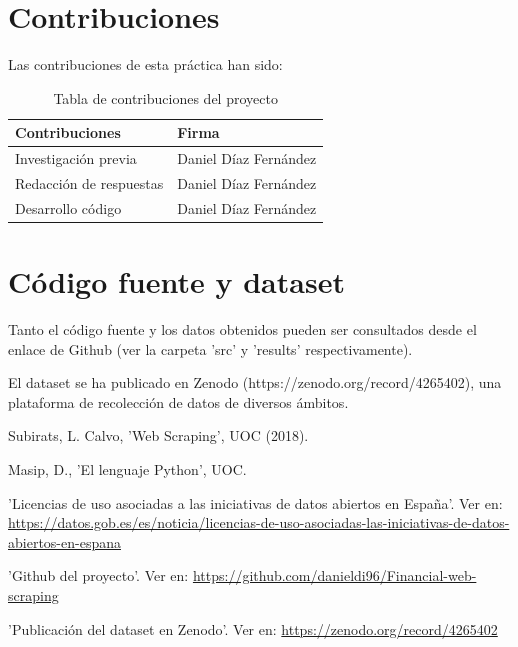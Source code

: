 \documentclass[12pt]{article}
\begin{document}
\section*{Contribuciones}
Las contribuciones de esta práctica han sido:
\begin{table}[h!]
    \centering
     \begin{tabular}{p{5cm}p{5cm}} 
     \hline
     \textbf{Contribuciones} & \textbf{Firma} \\
     \hline
     Investigación previa & Daniel Díaz Fernández \\
     Redacción de respuestas & Daniel Díaz Fernández \\
     Desarrollo código & Daniel Díaz Fernández \\
     \hline
    \end{tabular}
    \caption{Tabla de contribuciones del proyecto}
    \label{ComparativaAPITwitter}
\end{table}

\section*{Código fuente y dataset}
Tanto el código fuente y los datos obtenidos pueden ser consultados desde el enlace de Github (ver la carpeta 'src' y 'results' respectivamente).

El dataset se ha publicado en Zenodo (https://zenodo.org/record/4265402), una plataforma de recolección de datos de diversos ámbitos.


\clearpage
\begin{thebibliography}{9}
	Subirats, L. Calvo, 'Web Scraping', UOC (2018).
	
	Masip, D., 'El lenguaje Python', UOC.
	
	'Licencias de uso asociadas a las iniciativas de datos abiertos en España'. Ver en: \url{https://datos.gob.es/es/noticia/licencias-de-uso-asociadas-las-iniciativas-de-datos-abiertos-en-espana}
	
	'Github del proyecto'. Ver en: \url{https://github.com/danieldi96/Financial-web-scraping}
	
	'Publicación del dataset en Zenodo'. Ver en: \url{https://zenodo.org/record/4265402}

	
	
\end{thebibliography}
\end{document}
